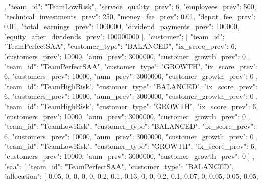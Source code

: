 {{{            },
            {
                "team_id": "TeamLowRisk",
                "service_quality_prev": 6,
                "employees_prev": 500,
                "technical_investments_prev": 250,
                "money_fee_prev": 0.01,
                "depot_fee_prev": 0.01,
                "total_earnings_prev": 1000000,
                "dividend_payments_prev": 100000,
                "equity_after_dividends_prev": 100000000
            }
        ],
        "customer": [
            {
                "team_id": "TeamPerfectSAA",
                "customer_type": "BALANCED",
                "ix_score_prev": 6,
                "customers_prev": 10000,
                "aum_prev": 3000000,
                "customer_growth_prev": 0
            },
            {
                "team_id": "TeamPerfectSAA",
                "customer_type": "GROWTH",
                "ix_score_prev": 6,
                "customers_prev": 10000,
                "aum_prev": 3000000,
                "customer_growth_prev": 0
            },
            {
                "team_id": "TeamHighRisk",
                "customer_type": "BALANCED",
                "ix_score_prev": 6,
                "customers_prev": 10000,
                "aum_prev": 3000000,
                "customer_growth_prev": 0
            },
            {
                "team_id": "TeamHighRisk",
                "customer_type": "GROWTH",
                "ix_score_prev": 6,
                "customers_prev": 10000,
                "aum_prev": 3000000,
                "customer_growth_prev": 0
            },
            {
                "team_id": "TeamLowRisk",
                "customer_type": "BALANCED",
                "ix_score_prev": 6,
                "customers_prev": 10000,
                "aum_prev": 3000000,
                "customer_growth_prev": 0
            },
            {
                "team_id": "TeamLowRisk",
                "customer_type": "GROWTH",
                "ix_score_prev": 6,
                "customers_prev": 10000,
                "aum_prev": 3000000,
                "customer_growth_prev": 0
            }
        ]
    },
    "saa": [
        {
            "team_id": "TeamPerfectSAA",
            "customer_type": "BALANCED",
            "allocation": [
                0.05,
                0,
                0,
                0,
                0,
                0.2,
                0.1,
                0.13,
                0,
                0,
                0.2,
                0.1,
                0.07,
                0,
                0.05,
                0.05,
                0.05,
}}
